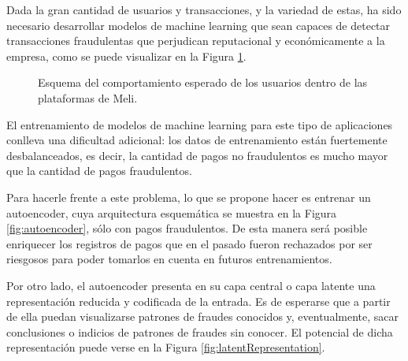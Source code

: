 \documentclass[
11pt, %
]{charter}
\begin{document}
Dada la gran cantidad de usuarios y transacciones, y la variedad de estas, ha sido necesario desarrollar modelos de machine learning que sean capaces de detectar transacciones fraudulentas que perjudican reputacional y económicamente  a la empresa, como se puede visualizar en la Figura \ref{fig:fraudster}.

\begin{figure}[H]
\centering
{}
\caption{Esquema del comportamiento esperado de los usuarios dentro de las plataformas de Meli.}
\label{fig:fraudster}
\end{figure}

El entrenamiento de modelos de machine learning para este tipo de aplicaciones conlleva una dificultad adicional: los datos de entrenamiento están fuertemente desbalanceados, es decir, la cantidad de pagos no fraudulentos es mucho mayor que la cantidad de pagos fraudulentos.

Para hacerle frente a este problema, lo que se propone hacer es entrenar un autoencoder, cuya arquitectura esquemática se muestra en la Figura \ref{fig:autoencoder}, sólo con pagos fraudulentos. De esta manera será posible enriquecer los registros de pagos que en el pasado fueron rechazados por ser riesgosos para poder tomarlos en cuenta en futuros entrenamientos. 

Por otro lado, el autoencoder presenta en su capa central o capa latente una representación reducida y codificada de la entrada. Es de esperarse que a partir de ella puedan visualizarse patrones de fraudes conocidos y, eventualmente, sacar conclusiones o indicios de patrones de fraudes sin conocer. El potencial de dicha representación puede verse en la Figura \ref{fig:latentRepresentation}.
\end{document}
